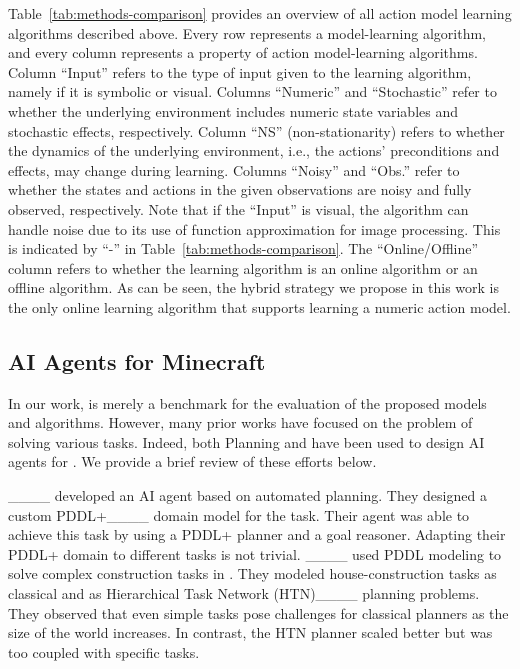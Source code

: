 Table~\ref{tab:methods-comparison} provides an overview of all action model learning algorithms described above. 
Every row represents a model-learning algorithm, and every column represents a property of action model-learning algorithms. 
Column ``Input'' refers to the type of input given to the learning algorithm, namely if it is symbolic or visual. 
Columns ``Numeric'' and ``Stochastic'' refer to whether the underlying environment includes numeric state variables and stochastic effects, respectively. 
Column ``NS'' (non-stationarity) 
refers to whether the dynamics of the underlying environment, i.e., the actions' preconditions and effects, may change during learning. 
Columns ``Noisy'' and ``Obs.'' refer to whether the states and actions in the given observations are noisy and fully observed, respectively. Note that if the ``Input'' is visual, the algorithm can handle noise due to its use of function approximation for image processing. This is indicated by ``-'' in Table~\ref{tab:methods-comparison}. 
The ``Online/Offline'' column refers to whether the learning algorithm is an online algorithm or an offline algorithm. 
As can be seen, the \hybrid hybrid strategy we propose in this work is the only online learning algorithm that supports learning a numeric action model. 





\subsection{AI Agents for Minecraft}
\label{sec:related-minecraft}
In our work, \mcraft is merely a benchmark for the evaluation of the proposed models and algorithms. 
However, many prior works have focused on the problem of solving various \mcraft tasks. 
Indeed, both Planning and \rl have been used to design AI agents for \mcraft. 
We provide a brief review of these efforts below. 



____ developed an AI \mcraft agent based on automated planning. They designed a custom PDDL+____ domain model for the \mcraft task. Their agent was able to achieve this task by using a PDDL+ planner and a goal reasoner. Adapting their PDDL+ domain to different tasks is not trivial. 
____ used PDDL modeling to solve complex construction tasks in \mcraft. 
They modeled house-construction tasks as classical and as Hierarchical Task Network (HTN)____ planning problems. 
They observed that even simple tasks pose challenges for classical planners as the size of the world increases. 
In contrast, the HTN planner scaled better but was too coupled with specific tasks.


